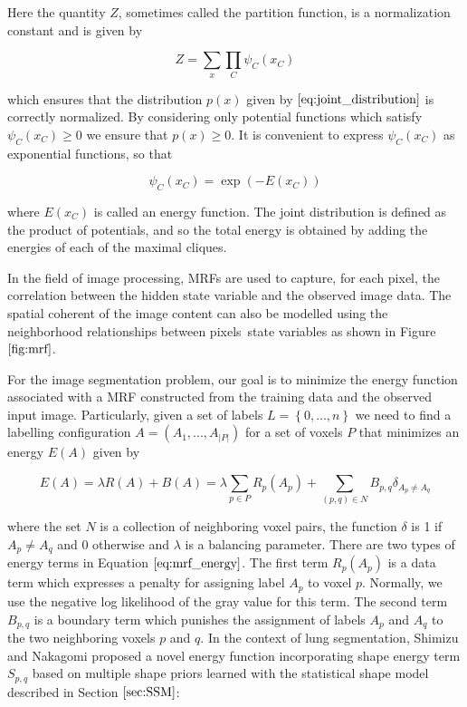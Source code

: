 \documentclass{SMBV12}
\begin{document}
Here the quantity $Z$, sometimes called the partition function, is a normalization constant and is given by

\begin{equation}
Z = \sum\limits_{x} \prod\limits_{C} \psi_C(x_C)
\end{equation}

which ensures that the distribution $p(x)$ given by $\ref{eq:joint_distribution}$ is correctly normalized. By considering only potential functions which satisfy $\psi_C(x_C) \geq 0$ we ensure that $p(x) \geq 0$. It is convenient to express $\psi_C(x_C)$ as exponential functions, so that

\begin{equation}
\psi_C(x_C) = \exp \left( -E(x_C) \right) 
\end{equation}

where $E(x_C)$ is called an energy function. The joint distribution is defined as the product of potentials, and so the total energy is obtained by adding the energies of each of the maximal cliques.

In the field of image processing, MRFs are used to capture, for each pixel, the correlation between the hidden state variable and the observed image data. The spatial coherent of the image content can also be modelled using the neighborhood relationships between pixels\textquotesingle \ state variables as shown in Figure $\ref{fig:mrf}$. 

For the image segmentation problem, our goal is to minimize the energy function associated with a MRF constructed from the training data and the observed input image. Particularly, given a set of labels $L = \left\lbrace 0, ..., n \right\rbrace $ we need to find a labelling configuration $A = (A_1, ..., A_{\lvert P \rvert})$ for a set of voxels $P$ that minimizes an energy $E(A)$ given by

\begin{equation}
E(A) = \lambda R(A) + B(A) = \lambda \sum_{p \in P} R_p(A_p) + \sum_{(p, q) \in N} B_{p, q} \delta_{A_p \neq A_q}
\label{eq:mrf_energy}
\end{equation}

where the set $N$ is a collection of neighboring voxel pairs, the function $\delta$ is 1 if $A_p \neq A_q$ and 0 otherwise and $\lambda$ is a balancing parameter. There are two types of energy terms in Equation $\ref{eq:mrf_energy}$. The first term $R_p(A_p)$ is a data term which expresses a penalty for assigning label $A_p$ to voxel $p$. Normally, we use the negative log likelihood of the gray value for this term. The second term $B_{p, q}$ is a boundary term which punishes the assignment of labels $A_p$ and $A_q$ to the two neighboring voxels $p$ and $q$. In the context of lung segmentation, Shimizu and Nakagomi \cite{shimizu2011automated} \cite{nakagomimulti} proposed a novel energy function incorporating shape energy term $S_{p, q}$ based on multiple shape priors learned with the statistical shape model described in Section $\ref{sec:SSM}$:
\end{document}
